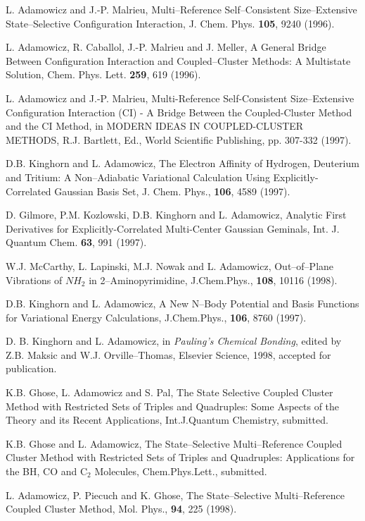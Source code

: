 \begin{thebibliography}{999}
L. Adamowicz and J.-P. Malrieu, Multi--Reference 
Self--Consistent Size--Extensive State--Selective
Configuration Interaction, J. Chem. Phys. 
{\bf 105}, 9240 (1996).

L. Adamowicz, R. Caballol, J.-P. Malrieu and J. Meller, 
A General Bridge Between Configuration
Interaction and Coupled--Cluster Methods:  A Multistate 
Solution, Chem. Phys. Lett.
{\bf 259}, 619 (1996).

L. Adamowicz and J.-P. Malrieu, Multi-Reference Self-Consistent 
Size--Extensive Configuration
Interaction (CI) - A Bridge Between the Coupled-Cluster 
Method and the CI Method, in MODERN
IDEAS IN COUPLED-CLUSTER METHODS, R.J. Bartlett, 
Ed., World Scientific Publishing, pp. 307-332 (1997).

D.B. Kinghorn and L. Adamowicz, 
The Electron Affinity of Hydrogen, Deuterium and Tritium:  
A Non--Adiabatic Variational Calculation Using Explicitly-Correlated 
Gaussian Basis Set, J. Chem. Phys.,
{\bf 106}, 4589 (1997).

D. Gilmore, P.M. Kozlowski, D.B. Kinghorn and 
L. Adamowicz, Analytic First Derivatives for
Explicitly-Correlated Multi-Center Gaussian Geminals, 
Int. J. Quantum Chem. {\bf 63}, 991 (1997).

W.J. McCarthy, L. Lapinski, M.J. Nowak and L. Adamowicz,
Out--of--Plane Vibrations of $NH_2$ in 2--Aminopyrimidine, 
J.Chem.Phys., {\bf 108}, 10116 (1998).  

D.B. Kinghorn and L. Adamowicz,
A New N--Body Potential and Basis Functions for
Variational Energy Calculations,
J.Chem.Phys., {\bf 106}, 8760 (1997).

D. B. Kinghorn and L. Adamowicz, in {\em Pauling's Chemical
Bonding}, edited by Z.B. Maksic and W.J. Orville--Thomas,
Elsevier Science, 1998, accepted for publication.

K.B. Ghose, L. Adamowicz and S. Pal,
The State Selective Coupled Cluster Method with
Restricted Sets of Triples and Quadruples:
Some Aspects of the Theory and its Recent Applications,
Int.J.Quantum Chemistry, submitted.

K.B. Ghose and L. Adamowicz,
The State--Selective Multi--Reference Coupled Cluster
Method with Restricted Sets of Triples and Quadruples:
Applications for the BH, CO and C$_2$ Molecules,
Chem.Phys.Lett., submitted.


L. Adamowicz, P. Piecuch and K. Ghose, 
The State--Selective Multi--Reference
Coupled Cluster Method, Mol. Phys., 
{\bf 94}, 225 (1998).




\end{thebibliography}
